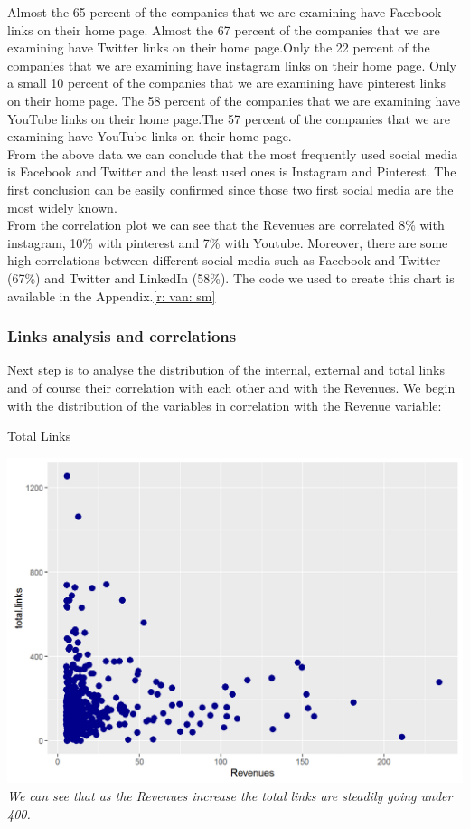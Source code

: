 \documentclass{book}
\begin{document}
Almost the 65 percent of the companies that we are examining have Facebook links on their home page. Almost the 67 percent of the companies that we are examining have Twitter links on their home page.Only the 22 percent of the companies that we are examining have instagram links on their home page. Only a small 10 percent of the companies that we are examining have pinterest links on their home page. The 58 percent of the companies that we are examining have YouTube links on their home page.The 57 percent of the companies that we are examining have YouTube links on their home page.\\
From the above data we can conclude that the most frequently used social media is Facebook and Twitter and the least used ones is Instagram and Pinterest. The first conclusion can be easily confirmed since those two first social media are the most widely known.\\
From the correlation plot we can see that the Revenues are correlated 8\% with instagram, 10\% with pinterest and 7\% with Youtube. Moreover, there are some high correlations between different social media such as Facebook and Twitter (67\%) and Twitter and LinkedIn (58\%). The code we used to create this chart is available in the Appendix.\ref{r: van: sm}

\subsubsection{Links analysis and correlations}
Next step is to analyse the distribution of the internal, external and total links and of course their correlation with each other and with the Revenues. We begin with the distribution of the variables in correlation with the Revenue variable:

\begin{table}[H]
\centering
\caption{Total Links}
\begin{center}
\includegraphics[scale=0.5]{../R/photos/24_totlinks_rev.png}  \\
\textit{We can see that as the Revenues increase the total links are steadily going under 400.}
\end{center}
\end{table}
\end{document}

